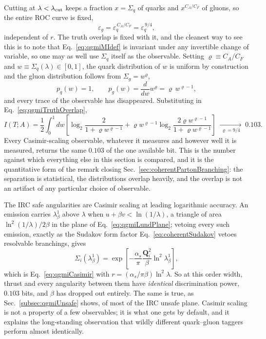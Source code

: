Cutting at \(\lambda<\lambda_{\rm cut}\) keeps a fraction \(x=\Sigma_q\) of quarks and
\(x^{C_A/C_F}\) of gluons, so the entire ROC curve is fixed,
\begin{equation}
	\varepsilon_g = \varepsilon_q^{\,C_A/C_F} = \varepsilon_q^{\,9/4} ,
	\label{eq:qgmiROC}
\end{equation}
independent of \(r\). The truth overlap is fixed with it, and the cleanest way to see
this is to note that Eq.~\ref{eq:qgmiMIdef} is invariant under any invertible change
of variable, so one may as well use \(\Sigma_q\) itself as the observable. Setting
\(\varrho\equiv C_A/C_F\) and \(w\equiv\Sigma_q(\lambda)\in[0,1]\), the quark
distribution of \(w\) is uniform by construction and the gluon distribution follows
from \(\Sigma_g=w^{\varrho}\),
\begin{equation}
	p_q(w) = 1 ,
	\qquad
	p_g(w) = \frac{d}{dw}w^\varrho = \varrho\,w^{\varrho-1} ,
	\label{eq:qgmiUniform}
\end{equation}
and every trace of the observable has disappeared. Substituting in
Eq.~\ref{eq:qgmiTruthOverlap},
\begin{equation}
	I(T;A) = \frac{1}{2}\int_0^1 dw\left[
	\log_2\frac{2}{1+\varrho w^{\varrho-1}}
	+ \varrho w^{\varrho-1}\log_2\frac{2\varrho w^{\varrho-1}}{1+\varrho w^{\varrho-1}}
	\right]
	\;\xrightarrow[\;\varrho=9/4\;]{}\;
	0.103 .
	\label{eq:qgmiBaseline}
\end{equation}
Every Casimir-scaling observable, whatever it measures and however well it is
measured, returns the same \(0.103\) of the one available bit. This is the number
against which everything else in this section is compared, and it is the quantitative
form of the remark closing Sec.~\ref{sec:coherentPartonBranching}: the separation is
statistical, the distributions overlap heavily, and the overlap is not an artifact of
any particular choice of observable.

The IRC safe angularities are Casimir scaling at leading logarithmic accuracy. An
emission carries \(\lambda^1_\beta\) above \(\lambda\) when \(u+\beta v<\ln(1/\lambda)\),
a triangle of area \(\ln^2(1/\lambda)/2\beta\) in the plane of
Eq.~\ref{eq:qgmiLundPlane}; vetoing every such emission, exactly as the Sudakov form
factor Eq.~\ref{eq:coherentSudakov} vetoes resolvable branchings, gives
\begin{equation}
	\Sigma_i(\lambda^1_\beta) = \exp\left[-\frac{\alpha_s}{\pi}
	\frac{\mathbf{Q}_i^2}{\beta}\ln^2\lambda^1_\beta\right] ,
	\label{eq:qgmiLLsudakov}
\end{equation}
which is Eq.~\ref{eq:qgmiCasimir} with \(r=(\alpha_s/\pi\beta)\ln^2\lambda\). So at
this order width, thrust and every angularity between them have \emph{identical}
discrimination power, \(0.103\) bits, and \(\beta\) has dropped out entirely. The
same is true, as Sec.~\ref{subsec:qgmiUnsafe} shows, of most of the IRC unsafe plane.
Casimir scaling is not a property of a few observables; it is what one gets by
default, and it explains the long-standing observation that wildly different
quark--gluon taggers perform almost identically.

